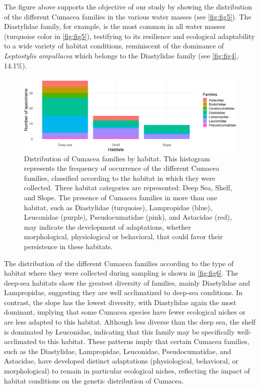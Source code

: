 The figure above supports the objective of our study by showing the distribution of the different Cumacea families in the various water masses (see \autoref{fig:fig5}). The Diastylidae family, for example, is the most common in all water masses (turquoise color in \autoref{fig:fig5}), testifying to its resilience and ecological adaptability to a wide variety of habitat conditions, reminiscent of the dominance of \emph{Leptostylis ampullacea} which belongs to the Diastylidae family (see \autoref{fig:fig4}, 14.1\%).

\begin{figure}[htbp]
    \centering
    \includegraphics[width=\textwidth]{figure4.png}
    \caption{Distribution of Cumacea families by habitat. This histogram represents the frequency of occurrence of the different Cumacea families, classified according to the habitat in which they were collected. Three habitat categories are represented: Deep Sea, Shelf, and Slope. The presence of Cumacea families in more than one habitat, such as Diastylidae (turquoise), Lampropidae (blue), Leuconidae (purple), Pseudocumatidae (pink), and Astacidae (red), may indicate the development of adaptations, whether morphological, physiological or behavioral, that could favor their persistence in these habitats. \label{fig:fig6}}
\end{figure}

The distribution of the different Cumacea families according to the type of habitat where they were collected during sampling is shown in \autoref{fig:fig6}. The deep-sea habitats show the greatest diversity of families, mainly Diastylidae and Lampropidae, suggesting they are well acclimatized to deep-sea conditions. In contrast, the slope has the lowest diversity, with Diastylidae again the most dominant, implying that some Cumacea species have fewer ecological niches or are less adapted to this habitat. Although less diverse than the deep sea, the shelf is dominated by Leuconidae, indicating that this family may be specifically well-acclimated to this habitat. These patterns imply that certain Cumacea families, such as the Diastylidae, Lampropidae, Leuconidae, Pseudocumatidae, and Astacidae, have developed distinct adaptations (physiological, behavioral, or morphological) to remain in particular ecological niches, reflecting the impact of habitat conditions on the genetic distribution of Cumacea.

